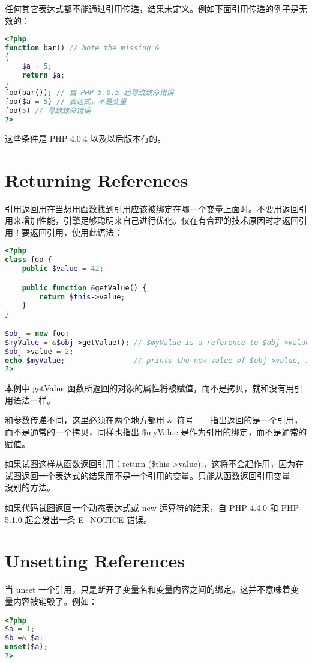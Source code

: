 任何其它表达式都不能通过引用传递，结果未定义。例如下面引用传递的例子是无效的：

\begin{lstlisting}[language=PHP]
<?php
function bar() // Note the missing &
{
    $a = 5;
    return $a;
}
foo(bar()); // 自 PHP 5.0.5 起导致致命错误
foo($a = 5) // 表达式，不是变量
foo(5) // 导致致命错误
?>
\end{lstlisting}

这些条件是 PHP 4.0.4 以及以后版本有的。


\chapter{Returning References}


引用返回用在当想用函数找到引用应该被绑定在哪一个变量上面时。不要用返回引用来增加性能，引擎足够聪明来自己进行优化。仅在有合理的技术原因时才返回引用！要返回引用，使用此语法：

\begin{lstlisting}[language=PHP]
<?php
class foo {
    public $value = 42;

    public function &getValue() {
        return $this->value;
    }
}

$obj = new foo;
$myValue = &$obj->getValue(); // $myValue is a reference to $obj->value, which is 42.
$obj->value = 2;
echo $myValue;                // prints the new value of $obj->value, i.e. 2.
?>
\end{lstlisting}

本例中 getValue 函数所返回的对象的属性将被赋值，而不是拷贝，就和没有用引用语法一样。

和参数传递不同，这里必须在两个地方都用 \& 符号——指出返回的是一个引用，而不是通常的一个拷贝，同样也指出 \$myValue 是作为引用的绑定，而不是通常的赋值。

如果试图这样从函数返回引用：return (\$this->value);，这将不会起作用，因为在试图返回一个表达式的结果而不是一个引用的变量。只能从函数返回引用变量——没别的方法。

如果代码试图返回一个动态表达式或 new 运算符的结果，自 PHP 4.4.0 和 PHP 5.1.0 起会发出一条 E\_NOTICE 错误。


\chapter{Unsetting References}

当 unset 一个引用，只是断开了变量名和变量内容之间的绑定。这并不意味着变量内容被销毁了。例如：

\begin{lstlisting}[language=PHP]
<?php
$a = 1;
$b =& $a;
unset($a);
?>
\end{lstlisting}

